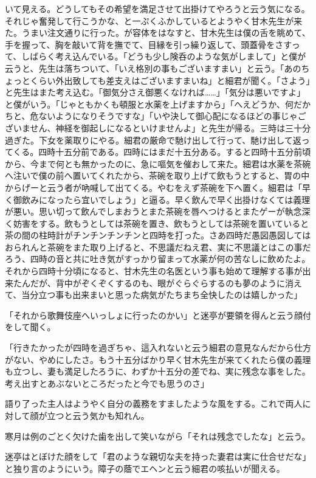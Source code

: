 \documentclass[12pt, openright]{book}
\begin{document}
いて見える。どうしてもその希望を満足させて出掛けてやろうと云う気になる。それじゃ奮発して行こうかな、と一ぷくふかしているとようやく甘木先生が来た。うまい注文通りに行った。が容体をはなすと、甘木先生は僕の舌を眺めて、手を握って、胸を敲いて背を撫でて、目縁を引っ繰り返して、頭蓋骨をさすって、しばらく考え込んでいる。「どうも少し険呑のような気がしまして」と僕が云うと、先生は落ちついて、「いえ格別の事もございますまい」と云う。「あのちょっとくらい外出致しても差支えはございますまいね」と細君が聞く。「さよう」と先生はまた考え込む。「御気分さえ御悪くなければ\ldots{}\ldots{}」「気分は悪いですよ」と僕がいう。「じゃともかくも頓服と水薬を上げますから」「へえどうか、何だかちと、危ないようになりそうですな」「いや決して御心配になるほどの事じゃございません、神経を御起しになるといけませんよ」と先生が帰る。三時は三十分過ぎた。下女を薬取りにやる。細君の厳命で馳け出して行って、馳け出して返ってくる。四時十五分前である。四時にはまだ十五分ある。すると四時十五分前頃から、今まで何とも無かったのに、急に嘔気を催おして来た。細君は水薬を茶碗へ注いで僕の前へ置いてくれたから、茶碗を取り上げて飲もうとすると、胃の中からげーと云う者が吶喊して出てくる。やむをえず茶碗を下へ置く。細君は「早く御飲みになったら宜いでしょう」と逼る。早く飲んで早く出掛けなくては義理が悪い。思い切って飲んでしまおうとまた茶碗を唇へつけるとまたゲーが執念深く妨害をする。飲もうとしては茶碗を置き、飲もうとしては茶碗を置いていると茶の間の柱時計がチンチンチンチンと四時を打った。さあ四時だ愚図愚図してはおられんと茶碗をまた取り上げると、不思議だねえ君、実に不思議とはこの事だろう、四時の音と共に吐き気がすっかり留まって水薬が何の苦なしに飲めたよ。それから四時十分頃になると、甘木先生の名医という事も始めて理解する事が出来たんだが、背中がぞくぞくするのも、眼がぐらぐらするのも夢のように消えて、当分立つ事も出来まいと思った病気がたちまち全快したのは嬉しかった」

「それから歌舞伎座へいっしょに行ったのかい」と迷亭が要領を得んと云う顔付をして聞く。

「行きたかったが四時を過ぎちゃ、這入れないと云う細君の意見なんだから仕方がない、やめにしたさ。もう十五分ばかり早く甘木先生が来てくれたら僕の義理も立つし、妻も満足したろうに、わずか十五分の差でね、実に残念な事をした。考え出すとあぶないところだったと今でも思うのさ」

語り了った主人はようやく自分の義務をすましたような風をする。これで両人に対して顔が立つと云う気かも知れん。

寒月は例のごとく欠けた歯を出して笑いながら「それは残念でしたな」と云う。

迷亭はとぼけた顔をして「君のような親切な夫を持った妻君は実に仕合せだな」と独り言のようにいう。障子の蔭でエヘンと云う細君の咳払いが聞える。
\end{document}
